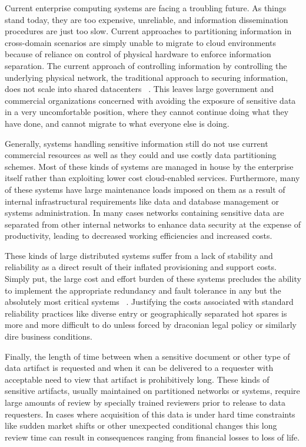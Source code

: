 Current enterprise computing systems are facing a troubling future.  As things stand today, they are too expensive, unreliable, and information dissemination procedures are just too slow.  Current approaches to partitioning information in cross-domain scenarios are simply unable to migrate to cloud environments because of reliance on control of physical hardware to enforce information separation.  The current approach of controlling information by controlling the underlying physical network, the traditional approach to securing information, does not scale into shared datacenters ~\cite{RedBook}.  This leaves large government and commercial organizations concerned with avoiding the exposure of sensitive data in a very uncomfortable position, where they cannot continue doing what they have done, and cannot migrate to what everyone else is doing.

Generally, systems handling sensitive information still do not use current commercial resources as well as they could and use costly data partitioning schemes.  Most of these kinds of systems are managed in house by the enterprise itself rather than exploiting lower cost cloud-enabled services.  Furthermore, many of these systems have large maintenance loads imposed on them as a result of internal infrastructural requirements like data and database management or systems administration.  In many cases networks containing sensitive data are separated from other internal networks to enhance data security at the expense of productivity, leading to decreased working efficiencies and increased costs.

These kinds of large distributed systems suffer from a lack of stability and reliability as a direct result of their inflated provisioning and support costs.  Simply put, the large cost and effort burden of these systems precludes the ability to implement the appropriate redundancy and fault tolerance in any but the absolutely most critical systems ~\cite{Tallon:2010:UDI:1735223.1735253}.  Justifying the costs associated with standard reliability practices like diverse entry or geographically separated hot spares is more and more difficult to do unless forced by draconian legal policy or similarly dire business conditions.

Finally, the length of time between when a sensitive document or other type of data artifact is requested and when it can be delivered to a requester with acceptable need to view that artifact is prohibitively long.  These kinds of sensitive artifacts, usually maintained on partitioned networks or systems, require large amounts of review by specially trained reviewers prior to release to data requesters.  In cases where acquisition of this data is under hard time constraints like sudden market shifts or other unexpected conditional changes this long review time can result in consequences ranging from financial losses to loss of life.

